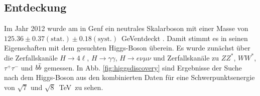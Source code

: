 \subsection{Entdeckung}
Im Jahr 2012 wurde am \lhc in Genf ein neutrales Skalarboson mit einer Masse von $125.36 \pm 0.37(\text{stat.}) \pm 0.18 (\text{syst.})$~GeVentdeckt \cite{Aad:2012tfa}. Damit stimmt es in seinen Eigenschaften mit dem gesuchten Higgs-Boson überein. Es wurde zunächst über die Zerfallskanäle $H \rightarrow 4 \ell$, $H \rightarrow \gamma\gamma$, $H \rightarrow e\nu\mu\nu$ und Zerfallskanäle zu $ZZ^*$, $WW^*$, $\tau^+\tau^-$ und $\mbox{$b\bar{b}$}$ gemessen. In Abb. \ref{fig:higgsdiscovery} sind Ergebnisse der Suche nach dem Higgs-Boson aus den kombinierten Daten für eine Schwerpunktsenergie von $\sqrt{7}$ und $\sqrt{8}$~TeV~zu sehen.
\begin{figure}
\centering

\end{figure}
